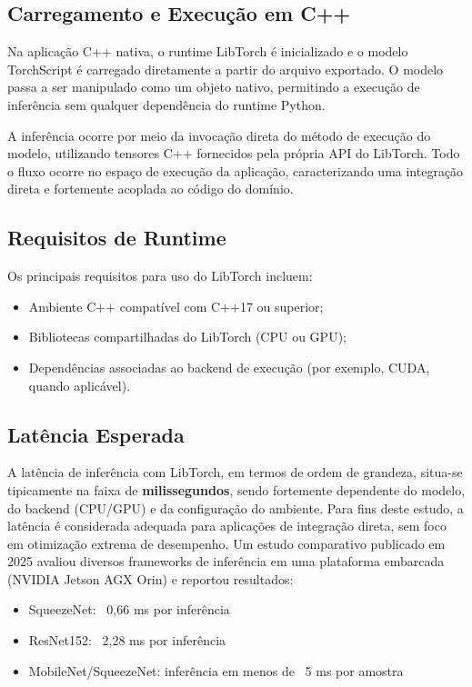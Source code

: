 \subsection{Carregamento e Execução em C++}

Na aplicação C++ nativa, o runtime LibTorch é inicializado e o modelo TorchScript é
carregado diretamente a partir do arquivo exportado. O modelo passa a ser manipulado
como um objeto nativo, permitindo a execução de inferência sem qualquer dependência
do runtime Python.

A inferência ocorre por meio da invocação direta do método de execução do modelo,
utilizando tensores C++ fornecidos pela própria API do LibTorch. Todo o fluxo ocorre
no espaço de execução da aplicação, caracterizando uma integração direta e fortemente
acoplada ao código do domínio.

\subsection{Requisitos de Runtime}

Os principais requisitos para uso do LibTorch incluem:
\begin{itemize}
    \item Ambiente C++ compatível com C++17 ou superior;
    \item Bibliotecas compartilhadas do LibTorch (CPU ou GPU);
    \item Dependências associadas ao backend de execução (por exemplo, CUDA, quando aplicável).
\end{itemize}

\subsection{Latência Esperada}

A latência de inferência com LibTorch, em termos de ordem de grandeza, situa-se
tipicamente na faixa de \textbf{milissegundos}, sendo fortemente dependente do modelo,
do backend (CPU/GPU) e da configuração do ambiente. Para fins deste estudo, a latência
é considerada adequada para aplicações de integração direta, sem foco em otimização
extrema de desempenho. 
Um estudo comparativo publicado em 2025 avaliou diversos frameworks de inferência em uma plataforma embarcada (NVIDIA Jetson AGX Orin) e reportou resultados: 
 \begin{itemize}
    \item SqueezeNet: ~0,66 ms por inferência
    \item ResNet152: ~2,28 ms por inferência
    \item MobileNet/SqueezeNet: inferência em menos de ~5 ms por amostra
\end{itemize}

